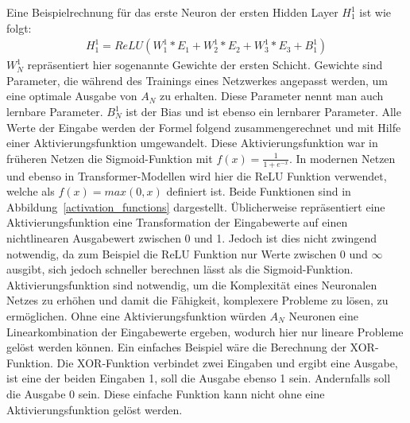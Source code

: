 Eine Beispielrechnung für das erste Neuron der ersten Hidden Layer $H^1_1$ ist wie folgt:
\begin{align}
    H^1_1=ReLU(W^1_1*E_1 + W^1_2*E_2 + W^1_3*E_3 + B^1_1)
\end{align}
$W^1_N$ repräsentiert hier sogenannte Gewichte der ersten Schicht.
Gewichte sind Parameter, die während des Trainings eines Netzwerkes angepasst werden, um eine optimale Ausgabe von $A_N$ zu erhalten.
Diese Parameter nennt man auch lernbare Parameter.
$B^1_N$ ist der Bias und ist ebenso ein lernbarer Parameter.
Alle Werte der Eingabe werden der Formel folgend zusammengerechnet und mit Hilfe einer Aktivierungsfunktion umgewandelt.
Diese Aktivierungsfunktion war in früheren Netzen die Sigmoid-Funktion mit $f(x)=\frac{1}{1+e^{-x}}$.
In modernen Netzen und ebenso in Transformer-Modellen wird hier die ReLU Funktion verwendet, welche als $f(x)=max(0,x)$ definiert ist.
Beide Funktionen sind in Abbildung~\ref{activation_functions} dargestellt.
Üblicherweise repräsentiert eine Aktivierungsfunktion eine Transformation der Eingabewerte auf einen nichtlinearen Ausgabewert zwischen 0 und 1.
Jedoch ist dies nicht zwingend notwendig, da zum Beispiel die ReLU Funktion nur Werte zwischen 0 und $\infty$ ausgibt, sich jedoch schneller berechnen lässt als die Sigmoid-Funktion.
Aktivierungsfunktion sind notwendig, um die Komplexität eines Neuronalen Netzes zu erhöhen und damit die Fähigkeit, komplexere Probleme zu lösen, zu ermöglichen.
Ohne eine Aktivierungsfunktion würden $A_N$ Neuronen eine Linearkombination der Eingabewerte ergeben, wodurch hier nur lineare Probleme gelöst werden können.
Ein einfaches Beispiel wäre die Berechnung der XOR-Funktion. Die XOR-Funktion verbindet zwei Eingaben und ergibt eine Ausgabe, ist eine der beiden Eingaben 1, soll die Ausgabe ebenso 1 sein.
Andernfalls soll die Ausgabe 0 sein. Diese einfache Funktion kann nicht ohne eine Aktivierungsfunktion gelöst werden.\\

